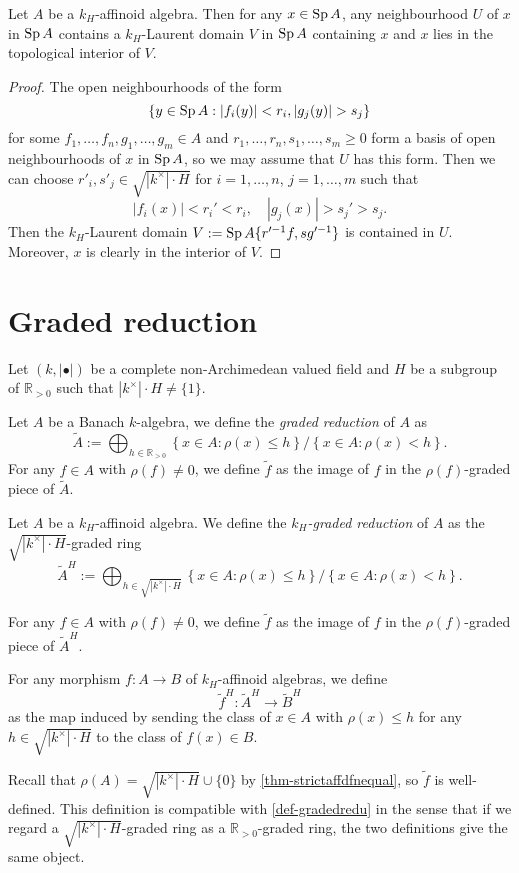 \begin{proposition}\label{prop-laurentdomainfundamental}
    Let $A$ be a $k_H$-affinoid algebra. Then for any $x\in\operatorname{Sp} A$, any neighbourhood $U$ of $x$ in $\operatorname{Sp} A$ contains a $k_H$-Laurent domain $V$ in $\operatorname{Sp} A$ containing $x$ and $x$ lies in the topological interior of $V$.
\end{proposition}
\begin{proof}
    The open neighbourhoods of the form
    \[
        \left\{y\in \Sp A: |f_i(y)|<r_i, |g_j(y)|>s_j \right\}  
    \]
    for some $f_1,\ldots,f_n,g_1,\ldots,g_m\in A$ and $r_1,\ldots,r_n,s_1,\ldots,s_m \geq 0$ form a basis of open neighbourhoods of $x$ in $\operatorname{Sp} A$, so we may assume that $U$ has this form. Then we can choose $r'_i,s'_j\in \sqrt{|k^{\times}|\cdot H}$ for $i=1,\ldots,n$, $j=1,\ldots,m$ such that
    \[
        |f_i(x)|<r_i'<r_i,\quad |g_j(x)|>s_j'>s_j.
    \]
    Then the $k_H$-Laurent domain $V:=\operatorname{Sp} A\{ r'^{-1}f,sg'^{-1} \}$ is contained in $U$. Moreover, $x$ is clearly in the interior of $V$.
\end{proof}


\section{Graded reduction}
Let $(k,|\bullet|)$ be a complete non-Archimedean valued field and $H$ be a subgroup of $\mathbb{R}_{>0}$ such that $|k^{\times}|\cdot H\neq \{1\}$.

\begin{definition}\label{def-gradedredu}
    Let $A$ be a Banach $k$-algebra, we define the \emph{graded reduction} of $A$ as
    \[
        \tilde{A}:=\bigoplus_{h\in \mathbb{R}_{>0}}  \left\{x\in A:\rho(x)\leq  h\right\}/\left\{x\in A:\rho(x)<  h\right\}.  
    \]
    For any $f\in A$ with $\rho(f)\neq 0$, we define $\tilde{f}$ as the image of $f$ in the $\rho(f)$-graded piece of $\tilde{A}$.
\end{definition}



\begin{definition}
    Let $A$ be a $k_H$-affinoid algebra. We define the \emph{$k_H$-graded reduction} of $A$ as the $\sqrt{|k^{\times}|\cdot H}$-graded ring
    \[
      \tilde{A}^H:=\bigoplus_{h\in \sqrt{|k^{\times}|\cdot H}}\left\{x\in A:\rho(x)\leq  h\right\}/\left\{x\in A:\rho(x)<  h\right\}.  
    \]

    For any $f\in A$ with $\rho(f)\neq 0$, we define $\tilde{f}$ as the image of $f$ in the $\rho(f)$-graded piece of $\tilde{A}^H$.

    For any morphism $f:A\rightarrow B$ of $k_H$-affinoid algebras, we define 
    \[
        \tilde{f}^H:  \tilde{A}^H\rightarrow \tilde{B}^H
    \]
    as the map induced by sending the class of $x\in A$ with $\rho(x)\leq h$ for any $h\in \sqrt{|k^{\times}|\cdot H}$ to the class of $f(x)\in B$.
\end{definition}
Recall that $\rho(A)=\sqrt{|k^{\times}|\cdot H}\cup\{0\}$ by \cref{thm-strictaffdfnequal}, so $\tilde{f}$ is well-defined. This definition is compatible with \cref{def-gradedredu} in the sense that if we regard a  $\sqrt{|k^{\times}|\cdot H}$-graded ring as a $\mathbb{R}_{>0}$-graded ring, the two definitions give the same object.

